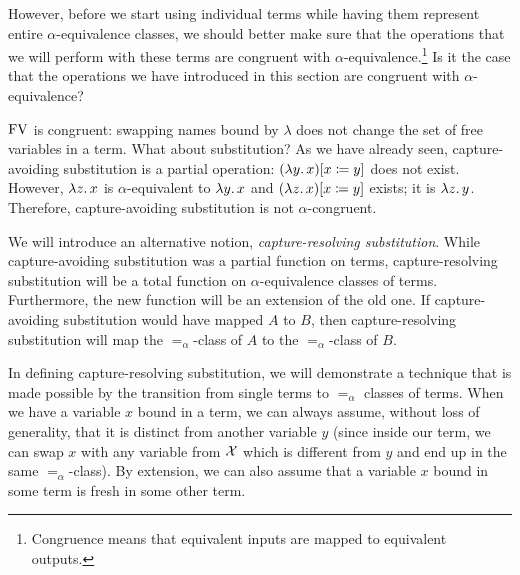 However, before we start using individual terms while having them represent
entire $\alpha$-equivalence classes, we should better make sure that the
operations that we will perform with these terms are congruent with
$\alpha$-equivalence.\footnote{Congruence means that equivalent inputs are
  mapped to equivalent outputs.} Is it the case that the operations we have
introduced in this section are congruent with $\alpha$-equivalence?

$\operatorname{FV}$ is congruent: swapping names bound by $\lambda$ does not change the
set of free variables in a term. What about substitution? As we have
already seen, capture-avoiding substitution is a partial operation:
$(\lambda y.\, x)[x \coloneqq y]$ does not exist. However, $\lambda z.\, x$ is
$\alpha$-equivalent to $\lambda y.\, x$ and $(\lambda z.\, x)[x \coloneqq y]$
exists; it is $\lambda z.\, y$. Therefore, capture-avoiding substitution is not
$\alpha$-congruent.

We will introduce an alternative notion, \emph{capture-resolving
  substitution}. While capture-avoiding substitution was a partial function
on terms, capture-resolving substitution will be a total function on
$\alpha$-equivalence classes of terms. Furthermore, the new function will
be an extension of the old one. If capture-avoiding substitution would have
mapped $A$ to $B$, then capture-resolving substitution will map the
$=_\alpha$-class of $A$ to the $=_\alpha$-class of $B$.

In defining capture-resolving substitution, we will demonstrate a technique
that is made possible by the transition from single terms to $=_\alpha$
classes of terms. When we have a variable $x$ bound in a term, we can
always assume, without loss of generality, that it is distinct from another
variable $y$ (since inside our term, we can swap $x$ with any variable from
$\mathcal{X}$ which is different from $y$ and end up in the same
$=_\alpha$-class). By extension, we can also assume that a variable $x$
bound in some term is fresh in some other term.

